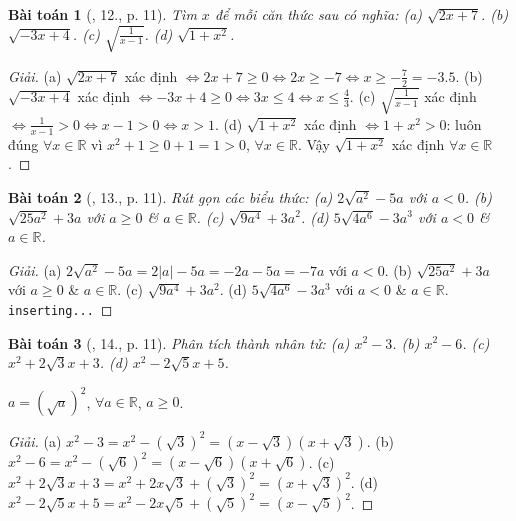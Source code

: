 \documentclass{article}
\newtheorem{baitoan}{Bài toán}
\begin{document}
\begin{baitoan}[\cite{SGK_Toan_9_tap_1}, 12., p. 11]
	Tìm $x$ để mỗi căn thức sau có nghĩa: (a) $\sqrt{2x + 7}$. (b) $\sqrt{-3x + 4}$. (c) $\sqrt{\frac{1}{x - 1}}$. (d) $\sqrt{1 + x^2}$.
\end{baitoan}

\begin{proof}[Giải]
	(a) $\sqrt{2x + 7}$ xác định $\Leftrightarrow2x + 7\ge0\Leftrightarrow2x\ge-7\Leftrightarrow x\ge-\frac{7}{2} = -3.5$. (b) $\sqrt{-3x + 4}$ xác định $\Leftrightarrow-3x + 4\ge0\Leftrightarrow3x\le4\Leftrightarrow x\le\frac{4}{3}$. (c) $\sqrt{\frac{1}{x - 1}}$ xác định $\Leftrightarrow\frac{1}{x - 1} > 0\Leftrightarrow x - 1 > 0\Leftrightarrow x > 1$. (d) $\sqrt{1 + x^2}$ xác định $\Leftrightarrow1 + x^2 > 0$: luôn đúng $\forall x\in\mathbb{R}$ vì $x^2 + 1\ge0 + 1 = 1 > 0$, $\forall x\in\mathbb{R}$. Vậy $\sqrt{1 + x^2}$ xác định $\forall x\in\mathbb{R}$.
\end{proof}

\begin{baitoan}[\cite{SGK_Toan_9_tap_1}, 13., p. 11]
	Rút gọn các biểu thức: (a) $2\sqrt{a^2} - 5a$ với $a < 0$. (b) $\sqrt{25a^2} + 3a$ với $a\ge0$ \& $a\in\mathbb{R}$. (c) $\sqrt{9a^4} + 3a^2$. (d) $5\sqrt{4a^6} - 3a^3$ với $a < 0$ \& $a\in\mathbb{R}$.
\end{baitoan}

\begin{proof}[Giải]
	(a) $2\sqrt{a^2} - 5a = 2|a| - 5a = -2a - 5a = -7a$ với $a < 0$. (b) $\sqrt{25a^2} + 3a$ với $a\ge0$ \& $a\in\mathbb{R}$. (c) $\sqrt{9a^4} + 3a^2$. (d) $5\sqrt{4a^6} - 3a^3$ với $a < 0$ \& $a\in\mathbb{R}$. \texttt{inserting...}
\end{proof}

\begin{baitoan}[\cite{SGK_Toan_9_tap_1}, 14., p. 11]
	Phân tích thành nhân tử: (a) $x^2 - 3$. (b) $x^2 - 6$. (c) $x^2 + 2\sqrt{3}x + 3$. (d) $x^2 - 2\sqrt{5}x + 5$.
\end{baitoan}
 $a = (\sqrt{a})^2$, $\forall a\in\mathbb{R}$, $a\ge0$.

\begin{proof}[Giải]
	(a) $x^2 - 3 = x^2 - (\sqrt{3})^2 = (x - \sqrt{3})(x + \sqrt{3})$. (b) $x^2 - 6 = x^2 - (\sqrt{6})^2 = (x - \sqrt{6})(x + \sqrt{6})$. (c) $x^2 + 2\sqrt{3}x + 3 = x^2 + 2x\sqrt{3} + (\sqrt{3})^2  = (x + \sqrt{3})^2$. (d) $x^2 - 2\sqrt{5}x + 5 = x^2 - 2x\sqrt{5} + (\sqrt{5})^2 = (x - \sqrt{5})^2$.
\end{proof}
\end{document}
